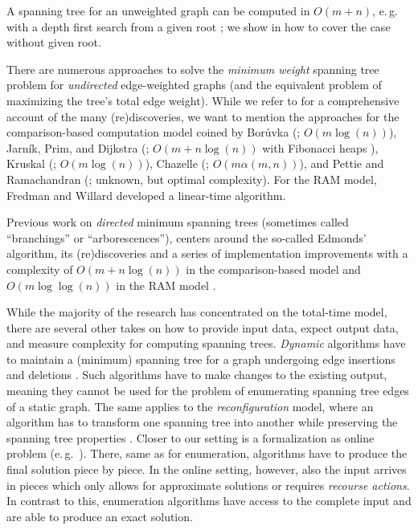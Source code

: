 \documentclass[a4paper, USenglish, cleveref, autoref, thm-restate]{lipics-v2021}
\begin{document}
A spanning tree for an unweighted graph can be computed in $O(m + n)$, e.\,g. with a depth first search from a given root \cite{cormenIntroductionAlgorithms2022}; we show in  how to cover the case without given root.

There are numerous approaches to solve the \textit{minimum weight} spanning tree problem for \textit{undirected} edge-weighted graphs (and the equivalent problem of maximizing the tree's total edge weight).
While we refer to \cite{grahamHistoryMinimumSpanning1985,nesetrilFewRemarksHistory1997,ericksonAlgorithms2019} for a comprehensive account of the many (re)discoveries, we want to mention the approaches for the comparison-based computation model coined by Borůvka (\cite{boruvkaJistemProblemuMinimalnim1926}; $O(m\log(n))$), Jarník, Prim, and Dijkstra (\cite{jarnikJistemProblemuMinimalnim1930,primShortestConnectionNetworks1957,dijkstraNoteTwoProblems1959}; $O(m+n\log(n))$ with Fibonacci heaps \cite{fredmanFibonacciHeapsTheir1987}), Kruskal (\cite{kruskalShortestSpanningSubtree1956}; $O(m\log(n))$), Chazelle (\cite{chazelleMinimumSpanningTree2000}; $O(m\alpha(m,n))$), and Pettie and Ramachandran (\cite{pettieOptimalMinimumSpanning2002}; unknown, but optimal complexity).
For the RAM model, Fredman and Willard \cite{fredmanTransdichotomousAlgorithmsMinimum1994} developed a linear-time algorithm.

Previous work on \textit{directed} minimum spanning trees (sometimes called \enquote{branchings} or \enquote{arborescences}), centers around the so-called Edmonds' algorithm, its (re)discoveries and a series of implementation improvements with a complexity of $O(m + n\log(n))$ in the comparison-based model and $O(m\log\log(n))$ in the RAM model \cite{chuShortestArborescenceDirected1965,edmondsOptimumBranchings1967,bockAlgorithmConstructMinimum1971,karpSimpleDerivationEdmonds1971,tarjanFindingOptimumBranchings1977,cameriniNoteFindingOptimum1979,gabowEfficientAlgorithmsFinding1986,mendelsonMeldingPriorityQueues2006}.

While the majority of the research has concentrated on the total-time model, there are several other takes on how to provide input data, expect output data, and measure complexity for computing spanning trees.
\textit{Dynamic} algorithms have to maintain a (minimum) spanning tree for a graph undergoing edge insertions and deletions \cite{holmPolylogarithmicDeterministicFullydynamic2001}.
Such algorithms have to make changes to the existing output, meaning they cannot be used for the problem of enumerating spanning tree edges of a static graph.
The same applies to the \textit{reconfiguration} model, where an algorithm has to transform one spanning tree into another while preserving the spanning tree properties \cite{itoComplexityReconfigurationProblems2011}.
Closer to our setting is a formalization as online problem (e.\,g.~\cite{bergOnlineMinimumSpanning2023,megowPowerRecourseOnline2012}).
There, same as for enumeration, algorithms have to produce the final solution piece by piece.
In the online setting, however, also the input arrives in pieces which only allows for approximate solutions or requires \textit{recourse actions}.
In contrast to this, enumeration algorithms have access to the complete input and are able to produce an exact solution.
\end{document}
